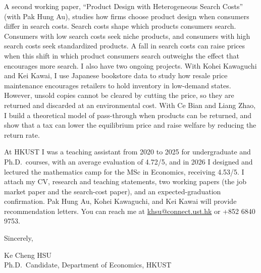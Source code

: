 \documentclass[11pt]{article}
\begin{document}
A second working paper, ``Product Design with Heterogeneous Search Costs'' (with Pak Hung Au), studies how firms choose product design when consumers differ in search costs. Search costs shape which products consumers search. Consumers with low search costs seek niche products, and consumers with high search costs seek standardized products. A fall in search costs can raise prices when this shift in which product consumers search outweighs the effect that encourages more search. I also have two ongoing projects. With Kohei Kawaguchi and Kei Kawai, I use Japanese bookstore data to study how resale price maintenance encourages retailers to hold inventory in low-demand states. However, unsold copies cannot be cleared by cutting the price, so they are returned and discarded at an environmental cost. With Ce Bian and Liang Zhao, I build a theoretical model of pass-through when products can be returned, and show that a tax can lower the equilibrium price and raise welfare by reducing the return rate.

At HKUST I was a teaching assistant from 2020 to 2025 for undergraduate and Ph.D.\ courses, with an average evaluation of 4.72/5, and in 2026 I designed and lectured the mathematics camp for the MSc in Economics, receiving 4.53/5. I attach my CV, research and teaching statements, two working papers (the job market paper and the search-cost paper), and an expected-graduation confirmation. Pak Hung Au, Kohei Kawaguchi, and Kei Kawai will provide recommendation letters. You can reach me at \href{mailto:khsu@connect.ust.hk}{khsu@connect.ust.hk} or +852 6840 9753.

\vspace{0.35em}
Sincerely,

\vspace{0.35em}
Ke Cheng HSU \\
Ph.D.\ Candidate, Department of Economics, HKUST
\end{document}
